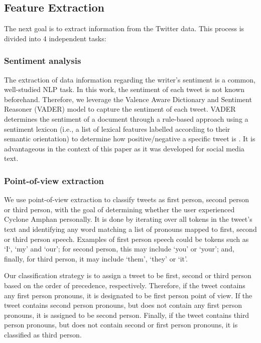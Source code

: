 \documentclass{article}
\begin{document}
\subsection{Feature Extraction}

The next goal is to extract information from the Twitter data. This process is divided into 4
independent tasks: 

\subsubsection{Sentiment analysis}

The extraction of data information regarding the writer's sentiment is a common, well-studied NLP
task. In this work, the sentiment of each tweet is not known beforehand. Therefore, we leverage the
Valence Aware Dictionary and Sentiment Reasoner (VADER) model \cite{Hutto2014} to capture the
sentiment of each tweet. VADER determines the sentiment of a document through a rule-based approach
using a sentiment lexicon (i.e., a list of lexical features labelled according to their semantic
orientation) to determine how positive/negative a specific tweet is \cite{Hutto2014}. It is
advantageous in the context of this paper as it was developed for social media text.

\subsubsection{Point-of-view extraction}

We use point-of-view extraction to classify tweets as first person, second person or third person,
with the goal of determining whether the user experienced Cyclone Amphan personally. It is done by
iterating over all tokens in the tweet's text and identifying any word matching a list of pronouns
mapped to first, second or third person speech. Examples of first person speech could be tokens such
as `I`, `my' and `our'; for second person, this may include `you' or `your'; and, finally, for third
person, it may include `them', `they' or `it'.

Our classification strategy is to assign a tweet to be first, second or third person based on the
order of precedence, respectively. Therefore, if the tweet contains any first person pronouns, it is
designated to be first person point of view. If the tweet contains second person pronouns, but does
not contain any first person pronouns, it is assigned to be second person. Finally, if the tweet
contains third person pronouns, but does not contain second or first person pronouns, it is
classified as third person.
\end{document}
